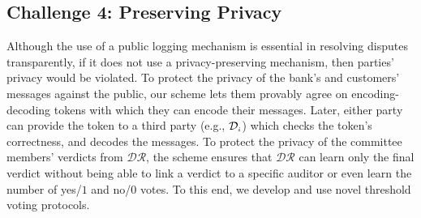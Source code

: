 \subsection{Challenge 4: Preserving Privacy}
 Although the use of a public logging mechanism is essential in resolving disputes transparently, if it does not use a  privacy-preserving mechanism, then parties' privacy would be violated. To protect the privacy of the bank's and customers' messages against the public, our scheme lets them provably agree on encoding-decoding tokens with which they can encode their messages. Later, either party can provide the token to a third party  (e.g., $\mathcal{D}_{\scriptscriptstyle i}$) which checks the token's correctness, and decodes the messages. To protect the privacy of the committee members' verdicts from $\mathcal{DR}$, the scheme ensures that  $\mathcal{DR}$ can learn only the final verdict without being able to link a verdict to a specific auditor or even learn the number of yes/$1$ and no/$0$ votes. To this end, we develop and use novel threshold voting protocols. 











 
 
 
 